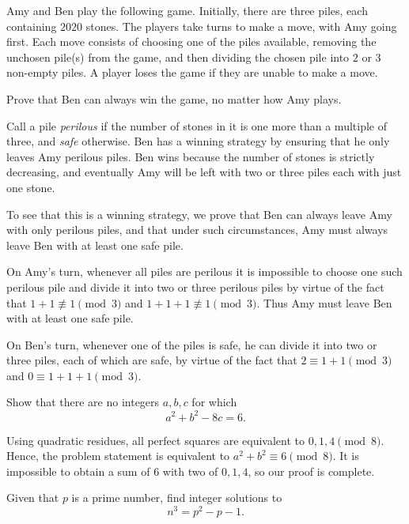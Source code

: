 \begin{prbm}
Amy and Ben play the following game. Initially, there are three piles, each containing $2020$ stones. The players take turns to make a move, with Amy going first. Each move consists of choosing one of the piles available, removing the unchosen pile(s) from the game, and then dividing the chosen pile into $2$ or $3$ non-empty piles. A player loses the game if they
are unable to make a move.

Prove that Ben can always win the game, no matter how Amy plays.
\end{prbm}

\begin{solution}
Call a pile \emph{perilous} if the number of stones in it is one more than a multiple of three, and \emph{safe} otherwise. Ben has a winning strategy by ensuring that he only leaves Amy perilous piles. Ben wins because the number of stones is strictly decreasing, and eventually Amy will be left with two or three piles each with just one stone.

To see that this is a winning strategy, we prove that Ben can always leave Amy with only perilous piles, and that under such circumstances, Amy must always leave Ben with at least one safe pile.

On Amy's turn, whenever all piles are perilous it is impossible to choose one such perilous pile and divide it into two or three perilous piles by virtue of the fact that $1+1\not\equiv1\pmod3$ and $1+1+1\not\equiv1\pmod3$. Thus Amy must leave Ben with at least one safe pile.

On Ben's turn, whenever one of the piles is safe, he can divide it into two or three piles, each of which are safe, by virtue of the fact that $2\equiv1+1\pmod3$ and $0\equiv1+1+1\pmod 3$.
\end{solution}

\begin{prbm}
Show that there are no integers $a,b,c$ for which 
\[a^2+b^2-8c=6.\]
\end{prbm}

\begin{solution}
Using quadratic residues, all perfect squares are equivalent to $0,1,4\pmod8$. Hence, the problem statement is equivalent to $a^2+b^2\equiv 6\pmod8$. It is impossible to obtain a sum of $6$ with two of $0,1,4$, so our proof is complete.
\end{solution}

\begin{prbm} 
Given that $p$ is a prime number, find integer solutions to 
\[n^3 = p^2 - p - 1.\] 
\end{prbm}

